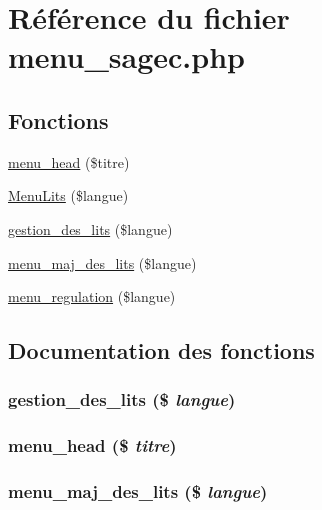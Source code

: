 \hypertarget{menu__sagec_8php}{
\section{R\'{e}f\'{e}rence du fichier menu\_\-sagec.php}
\label{menu__sagec_8php}
}
\subsection*{Fonctions}
\begin{CompactItemize}
\item 
\hyperlink{menu__sagec_8php_a0}{menu\_\-head} (\$titre)
\item 
\hyperlink{menu__sagec_8php_a1}{Menu\-Lits} (\$langue)
\item 
\hyperlink{menu__sagec_8php_a2}{gestion\_\-des\_\-lits} (\$langue)
\item 
\hyperlink{menu__sagec_8php_a3}{menu\_\-maj\_\-des\_\-lits} (\$langue)
\item 
\hyperlink{menu__sagec_8php_a4}{menu\_\-regulation} (\$langue)
\end{CompactItemize}


\subsection{Documentation des fonctions}
\hypertarget{menu__sagec_8php_a2}{
\subsubsection[gestion\_\-des\_\-lits]{\setlength{\rightskip}{0pt plus 5cm}gestion\_\-des\_\-lits (\$ {\em langue})}}
\label{menu__sagec_8php_a2}


\hypertarget{menu__sagec_8php_a0}{
\subsubsection[menu\_\-head]{\setlength{\rightskip}{0pt plus 5cm}menu\_\-head (\$ {\em titre})}}
\label{menu__sagec_8php_a0}


\hypertarget{menu__sagec_8php_a3}{
\subsubsection[menu\_\-maj\_\-des\_\-lits]{\setlength{\rightskip}{0pt plus 5cm}menu\_\-maj\_\-des\_\-lits (\$ {\em langue})}}
\label{menu__sagec_8php_a3}


